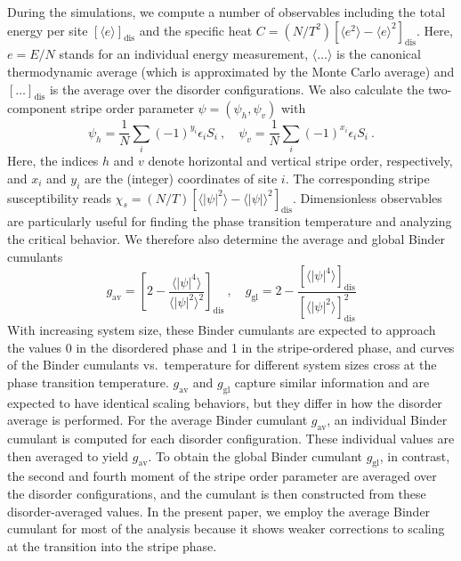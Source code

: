 \documentclass[twocolumn,showpacs,superscriptaddress,aps,prb]{revtex4-2}
\begin{document}
During the simulations, we compute a number of observables including the total energy per site
$[\langle e \rangle]_\mathrm{dis}$ and the specific heat
$C = (N/T^2)[\langle e^2 \rangle - \langle e \rangle^2]_\mathrm{dis}$. Here, $e=E/N$ stands for an
individual energy measurement, $\langle \ldots \rangle$ is the canonical thermodynamic average
(which is approximated by the Monte Carlo average) and $[ \ldots]_\mathrm{dis}$ is the average
over the disorder configurations. We also calculate the two-component stripe order parameter
$\psi=(\psi_h,\psi_v)$ with
\begin{equation}
\psi_h = \frac 1 N \sum_i (-1)^{y_i} \epsilon_i S_i ~, \quad\psi_v = \frac 1 N \sum_i (-1)^{x_i} \epsilon_i S_i ~.
\label{eq:stripe_OP}
\end{equation}
Here, the indices $h$ and $v$ denote horizontal and vertical stripe order, respectively, and
$x_i$ and $y_i$ are the (integer) coordinates of site $i$. The corresponding stripe susceptibility reads
$\chi_s =(N/T)[\langle |\psi|^2 \rangle - \langle |\psi| \rangle^2]_\mathrm{dis}$.
Dimensionless observables are particularly useful for finding the phase transition temperature
and analyzing the critical behavior. We therefore also determine the average and global Binder cumulants
\begin{equation}
g_\mathrm{av} = \left[ 2 - \frac{\langle |\psi|^4 \rangle}{\langle |\psi|^2 \rangle^2}\right]_\mathrm{dis}~, \quad
g_\mathrm{gl} =  2 - \frac{[\langle |\psi|^4 \rangle]_\mathrm{dis}}{[\langle |\psi|^2 \rangle]_\mathrm{dis}^2}
\label{eq:Binder}
\end{equation}
With increasing system size, these Binder cumulants are expected to approach the values 0 in the disordered phase
and 1 in the stripe-ordered phase, and curves of the Binder cumulants vs.\ temperature for different system sizes
cross at the phase transition temperature.  $g_\mathrm{av}$ and $g_\mathrm{gl}$ capture similar information and are
expected to have identical scaling behaviors, but they differ in how the
disorder average is performed. For the average Binder cumulant $g_\mathrm{av}$, an individual Binder cumulant is
computed for each disorder configuration. These individual values are then averaged to yield $g_\mathrm{av}$.
To obtain the global Binder cumulant $g_\mathrm{gl}$, in contrast, the second and fourth moment of the stripe
order parameter are averaged over the disorder configurations, and the cumulant is then constructed
from these disorder-averaged values. In the present paper, we employ the average Binder cumulant for most
of the analysis because it shows weaker corrections to scaling at the transition into the stripe phase.
\end{document}
